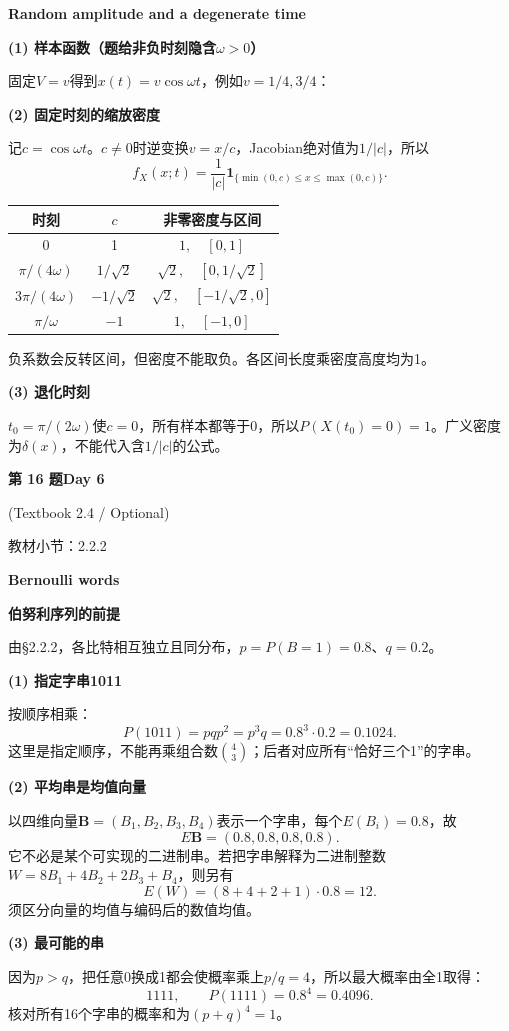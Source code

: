 \documentclass[10.5pt,fontset=fandol]{ctexart}
\newcommand{\key}[1]{\par\vspace{4pt}\noindent\textbf{\color{navy}#1}\par\vspace{2pt}}
\newcommand{\qtitle}[2]{\par\addvspace{1.2em}\Needspace{8\baselineskip}\begin{tcolorbox}[colback=navy,colframe=navy,arc=1.5pt,boxrule=0pt]\color{white}\large\bfseries #1\hfill\small #2\end{tcolorbox}}
\begin{document}
\noindent\textbf{Random amplitude and a degenerate time}\par\smallskip\begin{tcolorbox}[breakable,colback=qbg,colframe=qbg,boxrule=0pt]\key{(1) 样本函数（题给非负时刻隐含$\omega>0$）}
固定$V=v$得到$x(t)=v\cos\omega t$，例如$v=1/4,3/4$：
\begin{center}\end{center}
\key{(2) 固定时刻的缩放密度}
记$c=\cos\omega t$。$c\ne0$时逆变换$v=x/c$，Jacobian绝对值为$1/|c|$，所以
\[f_X(x;t)=\frac1{|c|}\mathbf1_{\{\min(0,c)\le x\le\max(0,c)\}}.\]
\begin{center}\begin{tabular}{ccc}\toprule 时刻 & $c$ & 非零密度与区间\\\midrule
$0$&1&$1,\quad[0,1]$\\
$\pi/(4\omega)$&$1/\sqrt2$&$\sqrt2,\quad[0,1/\sqrt2]$\\
$3\pi/(4\omega)$&$-1/\sqrt2$&$\sqrt2,\quad[-1/\sqrt2,0]$\\
$\pi/\omega$&$-1$&$1,\quad[-1,0]$\\\bottomrule\end{tabular}\end{center}
负系数会反转区间，但密度不能取负。各区间长度乘密度高度均为1。
\key{(3) 退化时刻}
$t_0=\pi/(2\omega)$使$c=0$，所有样本都等于0，所以$P(X(t_0)=0)=1$。广义密度为$\boxed{\delta(x)}$，不能代入含$1/|c|$的公式。

\end{tcolorbox}
\qtitle{第 16 题}{Day 6}
{\small\color{accentred}(Textbook 2.4 / Optional)}\par\smallskip
{\small\color{muted}教材小节：2.2.2}\par\medskip
\noindent\textbf{Bernoulli words}\par\smallskip\begin{tcolorbox}[breakable,colback=qbg,colframe=qbg,boxrule=0pt]\key{伯努利序列的前提}
由§2.2.2，各比特相互独立且同分布，$p=P(B=1)=0.8$、$q=0.2$。
\key{(1) 指定字串1011}
按顺序相乘：
\[\boxed{P(1011)=pqp^2=p^3q=0.8^3\cdot0.2=0.1024.}\]
这里是指定顺序，不能再乘组合数$\binom43$；后者对应所有“恰好三个1”的字串。
\key{(2) 平均串是均值向量}
以四维向量$\boldsymbol B=(B_1,B_2,B_3,B_4)$表示一个字串，每个$E(B_i)=0.8$，故
\[\boxed{E\boldsymbol B=(0.8,0.8,0.8,0.8).}\]
它不必是某个可实现的二进制串。若把字串解释为二进制整数$W=8B_1+4B_2+2B_3+B_4$，则另有
\[E(W)=(8+4+2+1)\cdot0.8=12.\]
须区分向量的均值与编码后的数值均值。
\key{(3) 最可能的串}
因为$p>q$，把任意0换成1都会使概率乘上$p/q=4$，所以最大概率由全1取得：
\[\boxed{1111,\qquad P(1111)=0.8^4=0.4096.}\]
核对所有16个字串的概率和为$(p+q)^4=1$。

\end{tcolorbox}
\end{document}
